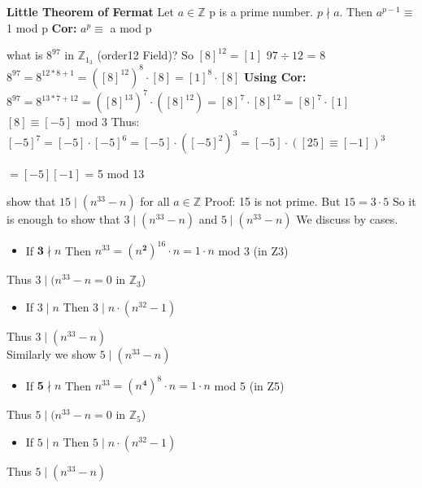 \documentclass{article}
\newcommand\Z{\ensuremath{\mathbb{Z}}}
\begin{document}
\begin{theorem}
    
    \textbf{Little Theorem of Fermat}
    \newline
    Let $a \in \Z$ p is a prime number. $p \nmid a.$
    Then $a^{p-1} \equiv$ 1 mod p
    \newline
    \textbf{Cor:} $a^{p} \equiv$ a mod p
\end{theorem}
\begin{Example}
    what is $8^{97}$ in $\Z_1_3$ (order12 Field)?
    \newline
    So $[8]^{12}=[1]$
    $97\div 12$ = 8
    \newline
    $8^{97}=8^{12*8+1}=([8]^{12})^8\cdot[8] = [1]^8\cdot[8]$
    \newline
    \newline
    \textbf{Using Cor:}
     $8^{97}=8^{13*7+12}=([8]^{13})^7\cdot([8]^{12}) = [8]^7\cdot[8]^{12} = [8]^7\cdot[1]$
     \newline
     $[8]\equiv[-5]$ mod 3
     \newline
     Thus:
     \newline
     $[-5]^7 = [-5]\cdot[-5]^6 = [-5]\cdot([-5]^2)^3 = [-5]\cdot([25]\equiv[-1])^3$
     
     \setlength\parindent{24pt} $= [-5][-1]$ = 5 mod 13
\end{Example}
\begin{Example}
    show that $15\mid(n^{33}-n)$ for all $a \in \Z$
    \newline
    Proof: 15 is not prime.
    \newline
    But $15 = 3\cdot5$
    \newline
    So it is enough to show that $3\mid (n^{33}-n)$ and $5\mid(n^{33}-n)$
    \newline
    We discuss by cases. 
    \begin{itemize}
        \item If $\textbf{3}\nmid n$ Then $n^{33} = (n^\textbf{2})^{16}\cdot n = 1\cdot n$ mod 3 (in Z3)
    \end{itemize}
    \hspace*{0.8cm} Thus $3\mid (n^{33} - n = 0 $ in $\Z_3$) 
    \begin{itemize}
        \item If $3\mid n$ Then $3\mid n\cdot (n^{32}-1)$
    \end{itemize}
    \hspace*{0.8cm} Thus $3\mid (n^{33}-n)$
    \\
    Similarly we show $5\mid(n^{33}-n)$
    \begin{itemize}
        \item If $\textbf{5}\nmid n$ Then $n^{33} = (n^\textbf{4})^8\cdot n = 1 \cdot n$ mod 5 (in Z5)
    \end{itemize}
    \hspace*{0.8cm} Thus $5 \mid (n^{33} - n = 0 $ in $\Z_5$) 
    \begin{itemize}
        \item If $5\mid n$ Then $5\mid n\cdot (n^{32}-1)$
    \end{itemize}
    \hspace*{0.8cm} Thus $5\mid (n^{33}-n)$
\end{Example}
\end{document}
